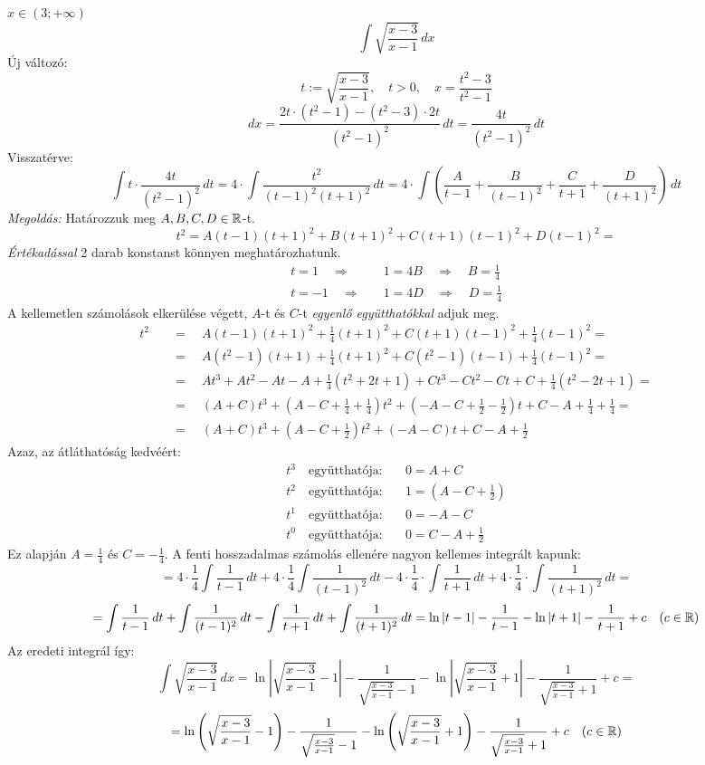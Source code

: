 \documentclass[a4paper,11.5pt]{article}
\begin{document}
	\begin{exercise}$x\in(3;+\infty)$
		\[ \int\sqrt{\frac{x-3}{x-1}}\,dx \]
		Új változó:
		\[ t:=\sqrt{\frac{x-3}{x-1}},\quad t>0,\quad x=\frac{t^2-3}{t^2-1} \]
		\[ dx=\frac{2t\cdot(t^2-1)-(t^2-3)\cdot2t}{(t^2-1)^2}\,dt=\frac{4t}{(t^2-1)^2}\,dt \]
		Visszatérve:
		\[ \int t\cdot\frac{4t}{(t^2-1)^2}\,dt=4\cdot\int\frac{t^2}{(t-1)^2(t+1)^2}\,dt=4\cdot\int\left(\frac{A}{t-1}+\frac{B}{(t-1)^2}+\frac{C}{t+1}+\frac{D}{(t+1)^2}\right)\,dt \]
		\textit{Megoldás:} Határozzuk meg $A,B,C,D\in\mathbb{R}$-t.
		\[ t^2=A(t-1)(t+1)^2+B(t+1)^2+C(t+1)(t-1)^2+D(t-1)^2= \]
		\textit{Értékadással} 2 darab konstanst könnyen meghatározhatunk.
		\begin{align*}
			t=1\quad \Rightarrow&\quad 1=4B\quad \Rightarrow\quad B=\frac{1}{4}\\
			t=-1\quad \Rightarrow&\quad 1=4D\quad \Rightarrow\quad D=\frac{1}{4}
		\end{align*}
		A kellemetlen számolások elkerülése végett, $A$-t és $C$-t \textit{egyenlő együtthatókkal} adjuk meg.
		\begin{align*}
		t^2\quad &=\quad A(t-1)(t+1)^2+\frac{1}{4}(t+1)^2+C(t+1)(t-1)^2+\frac{1}{4}(t-1)^2=\\
				 &=\quad A(t^2-1)(t+1)+\frac{1}{4}(t+1)^2+C(t^2-1)(t-1)+\frac{1}{4}(t-1)^2=\\
				 &=\quad At^3+At^2-At-A+\frac{1}{4}(t^2+2t+1)+Ct^3-Ct^2-Ct+C+\frac{1}{4}(t^2-2t+1)=\\
				 &=\quad (A+C)t^3+\left(A-C+\frac{1}{4}+\frac{1}{4}\right)t^2+\left(-A-C+\frac{1}{2}-\frac{1}{2}\right)t+C-A+\frac{1}{4}+\frac{1}{4}=\\
				 &=\quad (A+C)t^3+\left(A-C+\frac{1}{2}\right)t^2+(-A-C)t+C-A+\frac{1}{2}
		\end{align*}
		Azaz, az átláthatóság kedvéért:
		\begin{align*}
			t^3 \quad \text{együtthatója:}&\quad  0=A+C\\
			t^2 \quad \text{együtthatója:}&\quad  1=\left(A-C+\frac{1}{2}\right)\\
			t^1 \quad \text{együtthatója:}&\quad  0=-A-C\\
			t^0 \quad \text{együtthatója:}&\quad  0=C-A+\frac{1}{2}
		\end{align*}
		Ez alapján $A=\frac{1}{4}$ és $C=-\frac{1}{4}$. A fenti hosszadalmas számolás ellenére nagyon kellemes integrált kapunk:
		\[=4\cdot\frac{1}{4}\int\frac{1}{t-1}\,dt+4\cdot\frac{1}{4}\int\frac{1}{(t-1)^2}\,dt-4\cdot\frac{1}{4}\cdot\int\frac{1}{t+1}\,dt+4\cdot\frac{1}{4}\cdot\int\frac{1}{(t+1)^2}\,dt=\]
		\[=\int\frac{1}{t-1}\,dt+\int\frac{1}{(t-1)^2}\,dt-\int\frac{1}{t+1}\,dt+\int\frac{1}{(t+1)^2}\,dt=\ln|t-1|-\frac{1}{t-1}-\ln|t+1|-\frac{1}{t+1}+c\quad (c\in\mathbb{R}) \]
		Az eredeti integrál így:
		\[ \int\sqrt{\frac{x-3}{x-1}}\,dx=\ln\left|\sqrt{\frac{x-3}{x-1}}-1\right|-\frac{1}{\sqrt{\frac{x-3}{x-1}}-1}-\ln\left|\sqrt{\frac{x-3}{x-1}}+1\right|-\frac{1}{\sqrt{\frac{x-3}{x-1}}+1}+c= \]
		\[=\ln\left(\sqrt{\frac{x-3}{x-1}}-1\right)-\frac{1}{\sqrt{\frac{x-3}{x-1}}-1}-\ln\left(\sqrt{\frac{x-3}{x-1}}+1\right)-\frac{1}{\sqrt{\frac{x-3}{x-1}}+1}+c\quad (c\in\mathbb{R}) \]
	\end{exercise}
\end{document}

